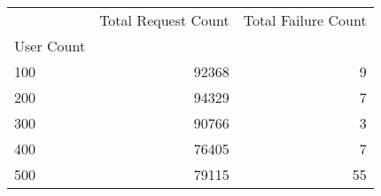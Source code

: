\begin{tabular}{lrr}
\toprule
 & Total Request Count & Total Failure Count \\
User Count &  &  \\
\midrule
100 & 92368 & 9 \\
200 & 94329 & 7 \\
300 & 90766 & 3 \\
400 & 76405 & 7 \\
500 & 79115 & 55 \\
\bottomrule
\end{tabular}
